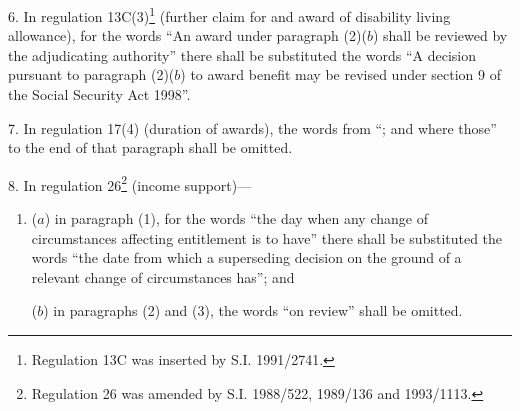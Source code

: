 \documentclass[12pt,a4paper]{article}
\begin{document}
\medskip

6.  In regulation 13C(3)\footnote{\frenchspacing Regulation 13C was inserted by S.I. 1991/2741.} (further claim for and award of disability living allowance), for the words “An award under paragraph (2)($b$)  shall be reviewed by the adjudicating authority” there shall be substituted the words “A decision pursuant to paragraph (2)($b$)  to award benefit may be revised under section 9 of the Social Security Act 1998”.

\medskip

7.  In regulation 17(4) (duration of awards), the words from “; and where those” to the end of that paragraph shall be omitted.

\medskip

8.  In regulation 26\footnote{\frenchspacing Regulation 26 was amended by S.I. 1988/522, 1989/136 and 1993/1113.} (income support)---
\begin{enumerate}\item[]
($a$) in paragraph (1), for the words “the day when any change of circumstances affecting entitlement is to have” there shall be substituted the words “the date from which a superseding decision on the ground of a relevant change of circumstances has”; and

($b$) in paragraphs (2) and (3), the words “on review” shall be omitted.
\end{enumerate}

\medskip
\end{document}
